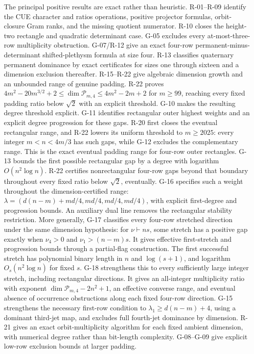 \documentclass[11pt,a4paper]{article}
\theoremstyle{definition}\newtheorem{definition}{Definition}
\begin{document}
The principal positive results are exact rather than heuristic. R-01--R-09 identify the CUE character and ratios operations, positive projector formulas, orbit-closure Gram ranks, and the missing quotient numerator. R-10 closes the height-two rectangle and quadratic determinant case. G-05 excludes every at-most-three-row multiplicity obstruction. G-07/R-12 give an exact four-row permanent-minus-determinant shifted-plethysm formula at size four. R-13 classifies quaternary permanent dominance by exact certificates for sizes one through sixteen and a dimension exclusion thereafter. R-15--R-22 give algebraic dimension growth and an unbounded range of genuine padding. R-22 proves $4m^2-20m^{3/2}+2\leq\dim\mathcal P_{m,4}\leq4m^2-2m+2$ for $m\geq99$, reaching every fixed padding ratio below $\sqrt2$ with an explicit threshold. G-10 makes the resulting degree threshold explicit. G-11 identifies rectangular outer highest weights and an explicit degree progression for these gaps. R-20 first closes the eventual rectangular range, and R-22 lowers its uniform threshold to $m\geq2025$: every integer $m<n<4m/3$ has such gaps, while G-12 excludes the complementary range. This is the exact eventual padding range for four-row outer rectangles. G-13 bounds the first possible rectangular gap by a degree with logarithm $O(n^2\log n)$. R-22 certifies nonrectangular four-row gaps beyond that boundary throughout every fixed ratio below $\sqrt2$, eventually. G-16 specifies such a weight throughout the dimension-certified range: $\lambda=(d(n-m)+md/4,md/4,md/4,md/4)$, with explicit first-degree and progression bounds. An auxiliary dual line removes the rectangular stability restriction. More generally, G-17 classifies every four-row stretched direction under the same dimension hypothesis: for $\nu\vdash ns$, some stretch has a positive gap exactly when $\nu_4>0$ and $\nu_1>(n-m)s$. It gives effective first-stretch and progression bounds through a partial-flag construction. The first successful stretch has polynomial binary length in $n$ and $\log(s+1)$, and logarithm $O_s(n^2\log n)$ for fixed $s$. G-18 strengthens this to every sufficiently large integer stretch, including rectangular directions. It gives an all-integer multiplicity ratio with exponent $\dim\mathcal P_{m,4}-2n^2+1$, an effective converse range, and eventual absence of occurrence obstructions along each fixed four-row direction. G-15 strengthens the necessary first-row condition to $\lambda_1\geq d(n-m)+4$, using a dominant third-jet map, and excludes full fourth-jet dominance by dimension. R-21 gives an exact orbit-multiplicity algorithm for each fixed ambient dimension, with numerical degree rather than bit-length complexity. G-08--G-09 give explicit low-row exclusion bounds at larger padding.
\end{document}
